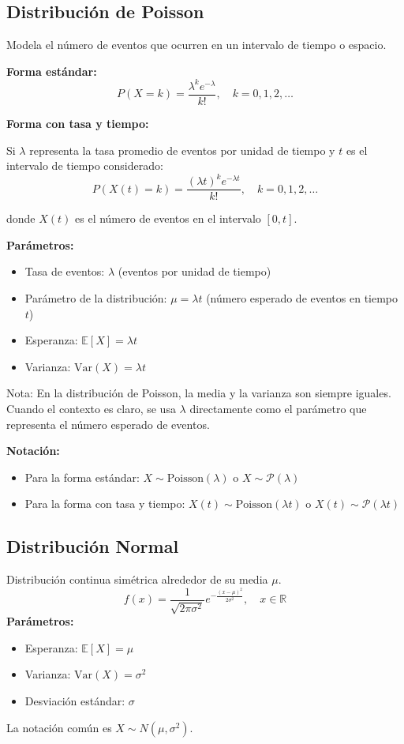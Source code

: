 \documentclass[12pt,a4paper]{article}
\begin{document}
\subsection{Distribución de Poisson}
Modela el número de eventos que ocurren en un intervalo de tiempo o espacio.

\textbf{Forma estándar:}
\begin{equation}
    P(X=k) = \frac{\lambda^k e^{-\lambda}}{k!}, \quad k=0,1,2,\dots
\end{equation}

\textbf{Forma con tasa y tiempo:}

Si $\lambda$ representa la tasa promedio de eventos por unidad de tiempo y $t$ es el intervalo de tiempo considerado:
\begin{equation}
    P(X(t)=k) = \frac{(\lambda t)^k e^{-\lambda t}}{k!}, \quad k=0,1,2,\dots
\end{equation}

donde $X(t)$ es el número de eventos en el intervalo $[0,t]$.

\textbf{Parámetros:}
\begin{itemize}
    \item Tasa de eventos: $\lambda$ (eventos por unidad de tiempo)
    \item Parámetro de la distribución: $\mu = \lambda t$ (número esperado de eventos en tiempo $t$)
    \item Esperanza: $\mathbb{E}[X] = \lambda t$
    \item Varianza: $\mathrm{Var}(X) = \lambda t$
\end{itemize}

Nota: En la distribución de Poisson, la media y la varianza son siempre iguales. Cuando el contexto es claro, se usa $\lambda$ directamente como el parámetro que representa el número esperado de eventos.

\textbf{Notación:}
\begin{itemize}
    \item Para la forma estándar: $X \sim \text{Poisson}(\lambda)$ o $X \sim \mathcal{P}(\lambda)$
    \item Para la forma con tasa y tiempo: $X(t) \sim \text{Poisson}(\lambda t)$ o $X(t) \sim \mathcal{P}(\lambda t)$
\end{itemize}

\subsection{Distribución Normal}
Distribución continua simétrica alrededor de su media $\mu$.
\begin{equation}
    f(x) = \frac{1}{\sqrt{2\pi\sigma^2}} e^{-\frac{(x-\mu)^2}{2\sigma^2}}, \quad x \in \mathbb{R}
\end{equation}
\textbf{Parámetros:}
\begin{itemize}
    \item Esperanza: $\mathbb{E}[X] = \mu$
    \item Varianza: $\mathrm{Var}(X) = \sigma^2$
    \item Desviación estándar: $\sigma$
\end{itemize}
La notación común es $X \sim N(\mu, \sigma^2)$.
\end{document}
